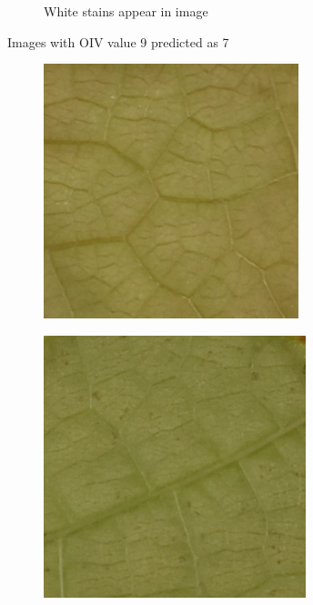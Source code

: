 \documentclass[english]{article}
\begin{document}
\begin{figure}[H]
\begin{subfigure}[b]{0.45\linewidth}
        \caption{White stains appear in image}\label{fig:error97b}
    \end{subfigure}
    \caption{Images with OIV value 9 predicted as 7}\label{fig:errors97}
\end{figure}

\begin{figure}[H]
    \centering
    \begin{subfigure}[b]{0.45\linewidth}
        \includegraphics[width=\linewidth]{error_79_2.png}
        \caption{}\label{fig:error79a}
    \end{subfigure}
    \begin{subfigure}[b]{0.45\linewidth}
        \includegraphics[width=\linewidth]{error_79_1.png}

\end{subfigure}
\end{figure}
\end{document}
